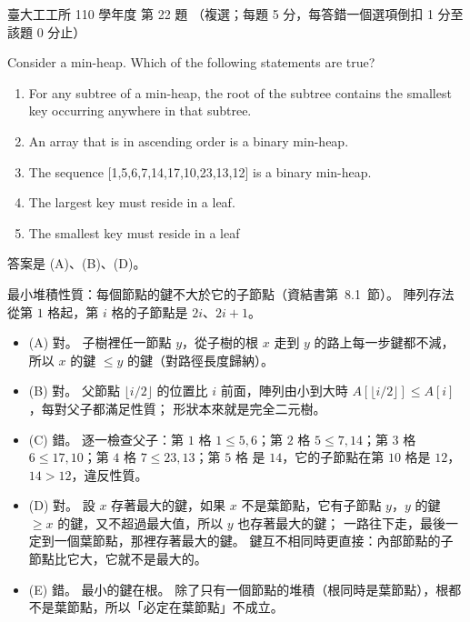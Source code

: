 \begin{pastexam}[label={px:ntu-110-ie-ds-22}]{臺大工工所 110 學年度 第 22 題}
（複選；每題 5 分，每答錯一個選項倒扣 1 分至該題 0 分止）

Consider a min-heap. Which of the following statements are true?
\begin{enumerate}[label=(\Alph*)]
\item For any subtree of a min-heap, the root of the subtree contains the smallest key occurring anywhere
in that subtree.
\item An array that is in ascending order is a binary min-heap.
\item The sequence [1,5,6,7,14,17,10,23,13,12] is a binary min-heap.
\item The largest key must reside in a leaf.
\item The smallest key must reside in a leaf
\end{enumerate}
\end{pastexam}

\begin{pastsoln}
答案是 (A)、(B)、(D)。

最小堆積性質：每個節點的鍵不大於它的子節點（資結書第~8.1~節）。 陣列存法從第 $1$ 格起，第 $i$ 格的子節點是 $2i$、$2i + 1$。
\begin{itemize}
\item (A) 對。 子樹裡任一節點 $y$，從子樹的根 $x$ 走到 $y$ 的路上每一步鍵都不減，所以 $x$ 的鍵 $\le y$ 的鍵（對路徑長度歸納）。
\item (B) 對。 父節點 $\lfloor i/2 \rfloor$ 的位置比 $i$ 前面，陣列由小到大時 $A[\lfloor i/2 \rfloor] \le A[i]$，每對父子都滿足性質；
形狀本來就是完全二元樹。
\item (C) 錯。 逐一檢查父子：第 $1$ 格 $1 \le 5, 6$；第 $2$ 格 $5 \le 7, 14$；第 $3$ 格 $6 \le 17, 10$；第 $4$ 格 $7 \le 23, 13$；第 $5$ 格
是 $14$，它的子節點在第 $10$ 格是 $12$，$14 > 12$，違反性質。
\item (D) 對。 設 $x$ 存著最大的鍵，如果 $x$ 不是葉節點，它有子節點 $y$，$y$ 的鍵 $\ge x$ 的鍵，又不超過最大值，所以 $y$ 也存著最大的鍵；
一路往下走，最後一定到一個葉節點，那裡存著最大的鍵。 鍵互不相同時更直接：內部節點的子節點比它大，它就不是最大的。
\item (E) 錯。 最小的鍵在根。 除了只有一個節點的堆積（根同時是葉節點），根都不是葉節點，所以「必定在葉節點」不成立。
\end{itemize}
\end{pastsoln}
